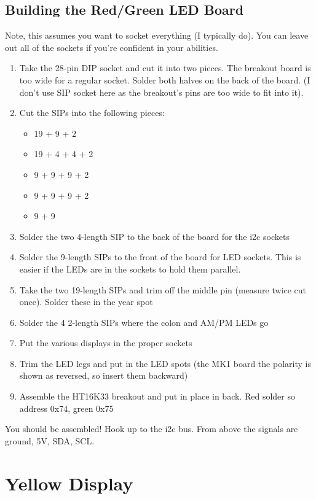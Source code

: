 \documentclass[11pt]{article}
\begin{document}
\subsection{Building the Red/Green LED Board}

Note, this assumes you want to socket everything (I typically do).
You can leave out all of the sockets if you're confident in your
abilities.

\begin{enumerate}
\item Take the 28-pin DIP socket and cut it into two pieces.
      The breakout board is too wide for a regular socket.
      Solder both halves on the back of the board.
      (I don't use SIP socket here as the breakout's pins are too
       wide to fit into it).
\item Cut the SIPs into the following pieces:
\begin{itemize}
\item 19 + 9 + 2
\item 19 + 4 + 4 + 2
\item 9 + 9 + 9 + 2
\item 9 + 9 + 9 + 2
\item 9 + 9
\end{itemize}
\item Solder the two 4-length SIP to the back of the board
      for the i2c sockets
\item Solder the 9-length SIPs to the front of the board for LED
      sockets.  This is easier if the LEDs are in the sockets to
      hold them parallel.
\item Take the two 19-length SIPs and trim off the middle pin
      (measure twice cut once).  Solder these in the year spot
\item Solder the 4 2-length SIPs where the colon and AM/PM LEDs go
\item Put the various displays in the proper sockets
\item Trim the LED legs and put in the LED spots (the MK1 board
      the polarity is shown as reversed, so insert them backward)
\item Assemble the HT16K33 breakout and put in place in back.
	Red solder so address 0x74, green 0x75
\end{enumerate}

You should be assembled!  Hook up to the i2c bus.  From above
the signals are ground, 5V, SDA, SCL.



\section{Yellow Display}
\end{document}
